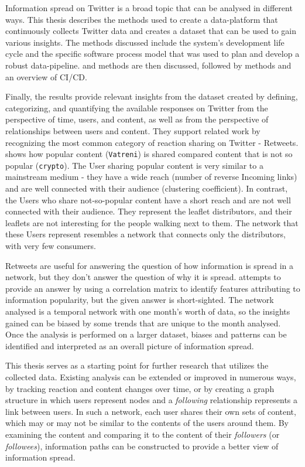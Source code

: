 Information spread on Twitter is a broad topic that can be analysed in different ways. This thesis describes the methods used to create a \gls{data-platform} that continuously collects Twitter data and creates a dataset that can be used to gain various insights. The methods discussed include the system's development life cycle and the specific software process model that was used to plan and develop a robust \gls{data-pipeline}.  and  methods are then discussed, followed by  methods and an overview of CI/CD.

Finally, the results provide relevant insights from the dataset created by defining, categorizing, and quantifying the available responses on Twitter from the perspective of time, users, and content, as well as from the perspective of relationships between users and content. They support related work by recognizing the most common category of reaction sharing on Twitter - Retweets.  shows how popular content (\texttt{Vatreni}) is shared compared content that is not so popular (\texttt{crypto}). The User sharing popular content is very similar to a mainstream medium - they have a wide reach (number of reverse Incoming links) and are well connected with their audience (clustering coefficient). In contrast, the Users who share not-so-popular content have a short reach and are not well connected with their audience. They represent the leaflet distributors, and their leaflets are not interesting for the people walking next to them. The network that these Users represent resembles a network that connects only the distributors, with very few consumers.

Retweets are useful for answering the question of how information is spread in a network, but they don't answer the question of why it is spread.  attempts to provide an answer by using a correlation matrix to identify features attributing to information popularity, but the given answer is short-sighted. The network analysed is a temporal network with one month's worth of data, so the insights gained can be biased by some trends that are unique to the month analysed. Once the analysis is performed on a larger dataset, biases and patterns can be identified and interpreted as an overall picture of information spread.

This thesis serves as a starting point for further research that utilizes the collected data. Existing analysis can be extended or improved in numerous ways, by tracking reaction and content changes over time, or by creating a graph structure in which users represent nodes and a \textit{following} relationship represents a link between users. In such a network, each user shares their own sets of content, which may or may not be similar to the contents of the users around them. By examining the content and comparing it to the content of their \textit{followers} (or \textit{followees}), information paths can be constructed to provide a better view of information spread.
